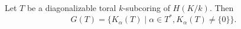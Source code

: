 Let $T$ be a diagonalizable toral $k$-subcoring of $H(K/k)$. Then
$$G(T) = \{K_\alpha(T) \mid \alpha \in T^*, K_\alpha(T) \neq \{0\}\}.$$

